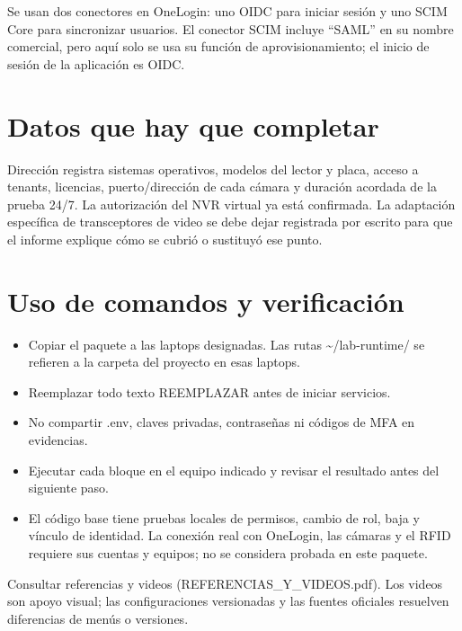 \documentclass[12pt,a4paper]{article}
\begin{document}
Se usan dos conectores en OneLogin: uno OIDC para iniciar sesión y uno SCIM Core para sincronizar usuarios. El conector SCIM incluye “SAML” en su nombre comercial, pero aquí solo se usa su función de aprovisionamiento; el inicio de sesión de la aplicación es OIDC.\par
{}\section*{Datos que hay que completar}
Dirección registra sistemas operativos, modelos del lector y placa, acceso a tenants, licencias, puerto/dirección de cada cámara y duración acordada de la prueba 24/7. La autorización del NVR virtual ya está confirmada. La adaptación específica de transceptores de video se debe dejar registrada por escrito para que el informe explique cómo se cubrió o sustituyó ese punto.\par
{}\section*{Uso de comandos y verificación}
\begin{itemize}
\item Copiar el paquete a las laptops designadas. Las rutas \textnormal{\textasciitilde{}/\allowbreak{}lab-runtime/\allowbreak{}} se refieren a la carpeta del proyecto en esas laptops.
\item Reemplazar todo texto \textnormal{REEMPLAZAR} antes de iniciar servicios.
\item No compartir \textnormal{.env}, claves privadas, contraseñas ni códigos de MFA en evidencias.
\item Ejecutar cada bloque en el equipo indicado y revisar el resultado antes del siguiente paso.
\item El código base tiene pruebas locales de permisos, cambio de rol, baja y vínculo de identidad. La conexión real con OneLogin, las cámaras y el RFID requiere sus cuentas y equipos; no se considera probada en este paquete.
\end{itemize}
Consultar referencias y videos (REFERENCIAS\_Y\_VIDEOS.pdf). Los videos son apoyo visual; las configuraciones versionadas y las fuentes oficiales resuelven diferencias de menús o versiones.\par
\end{document}
